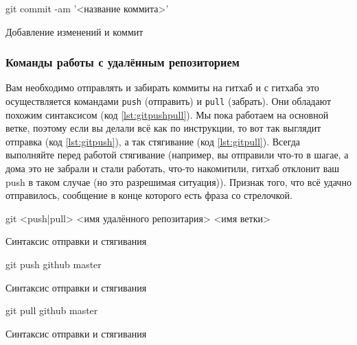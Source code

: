 \documentclass[12pt]{article}
\begin{document}
\begin{listing}[H]
\begin{center}
\begin{bashcode}
git commit -am '<название коммита>'
\end{bashcode}
\end{center}
\caption{Добавление изменений и коммит}
\label{lst:gitcommitam}
\end{listing}

\subsubsection{Команды работы с удалённым репозиторием}
Вам необходимо отправлять и забирать коммиты на гитхаб и с гитхаба это осуществляется командами \verb|push| (отправить) и \verb|pull| (забрать). Они обладают похожим синтаксисом (код \ref{lst:gitpushpull}). Мы пока работаем на основной ветке, поэтому если вы делали всё как по инструкции, то вот так выглядит отправка (код \ref{lst:gitpush}), а так стягивание (код \ref{lst:gitpull}). Всегда выполняйте перед работой стягивание (например, вы отправили что-то в шагае, а дома это не забрали и стали работать, что-то накомитили, гитхаб отклонит ваш push в таком случае (но это разрешимая ситуация)). Признак того, что всё удачно отправилось, сообщение в конце которого есть фраза со стрелочкой.

\begin{listing}[H]
\begin{center}
\begin{bashcode}
git <push|pull> <имя удалённого репозитария> <имя ветки>
\end{bashcode}
\end{center}
\caption{Синтаксис отправки и стягивания}
\label{lst:gitpushpull}
\end{listing}

\begin{listing}[H]
\begin{center}
\begin{bashcode}
git push github master
\end{bashcode}
\end{center}
\caption{Синтаксис отправки и стягивания}
\label{lst:gitpush}
\end{listing}

\begin{listing}[H]
\begin{center}
\begin{bashcode}
git pull github master
\end{bashcode}
\end{center}
\caption{Синтаксис отправки и стягивания}
\label{lst:gitpull}
\end{listing}
\end{document}
